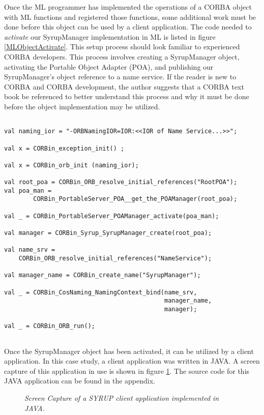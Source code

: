 Once the ML programmer has implemented the operations of a CORBA object with 
ML functions and registered those functions, some additional work must be done 
before this object can be used by a client application.  The code needed to 
{\em{activate}} our SyrupManager implementation in ML is listed in figure 
\ref{MLObjectActivate}. This setup process should look familiar to experienced 
CORBA developers.  This process involves creating a SyrupManager object, activating 
the Portable Object Adapter (POA), and publishing our SyrupManager's object 
reference to a name service.  If the reader is new to CORBA and CORBA development, 
the author suggests that a CORBA text book be referenced to better understand 
this process and why it must be done before the object implementation may 
be utilized.  
\begin{figure*}[t]
\singlespace
\begin{verbatim}

val naming_ior = "-ORBNamingIOR=IOR:<<IOR of Name Service...>>";

val x = CORBin_exception_init() ;

val x = CORBin_orb_init (naming_ior);

val root_poa = CORBin_ORB_resolve_initial_references("RootPOA");
val poa_man = 
        CORBin_PortableServer_POA__get_the_POAManager(root_poa);

val _ = CORBin_PortableServer_POAManager_activate(poa_man);

val manager = CORBin_Syrup_SyrupManager_create(root_poa);

val name_srv = 
    CORBin_ORB_resolve_initial_references("NameService");

val manager_name = CORBin_create_name("SyrupManager");

val _ = CORBin_CosNaming_NamingContext_bind(name_srv, 
                                            manager_name, 
                                            manager);

val _ = CORBin_ORB_run();
 
\end{verbatim}
\doublespace
\caption {{\em Code to activate the SyrupManager object implementation in ML}.}
\figline
        \label{MLObjectActivate}
\end{figure*}

Once the SyrupManager object has been activated, it can be utilized
by a client application.  In this case study, a client application was written 
in JAVA.  A screen capture of this application in use is shown in figure 
\ref{SyrupScreenShot}.  The source code for this JAVA application can be found in 
the appendix.
\begin{figure}
\begin{center}
\leavevmode
\caption{\em{Screen Capture of a SYRUP client application implemented in JAVA}.}
\figline
         \label{SyrupScreenShot}
\end{center}
\end{figure}

